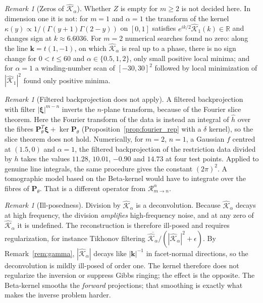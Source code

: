\documentclass[11pt,a4paper]{article}
\theoremstyle{plain}
\theoremstyle{definition}
\theoremstyle{remark}
\newtheorem{remark}[theorem]{Remark}
\numberwithin{equation}{section}
\begin{document}
\begin{remark}[Zeros of $\widehat{\mathcal{K}}_\alpha$]
Whether $Z$ is empty for $m \ge 2$ is not decided here. In dimension one it is not: for $m = 1$ and $\alpha = 1$ the transform of the kernel $\kappa(y) \propto 1/(\Gamma(y+1)\Gamma(2-y))$ on $[0,1]$ satisfies $e^{ik/2}\widehat{\mathcal{K}}_1(k) \in \mathbb{R}$ and changes sign at $k \approx 6.6036$. For $m = 2$ numerical searches found no zero: along the line $\mathbf{k} = t(1,-1)$, on which $\widehat{\mathcal{K}}_\alpha$ is real up to a phase, there is no sign change for $0 < t \le 60$ and $\alpha \in \{0.5, 1, 2\}$, only small positive local minima; and for $\alpha = 1$ a winding-number scan of $[-30,30]^2$ followed by local minimization of $|\widehat{\mathcal{K}}_1|^2$ found only positive minima.
\end{remark}

\begin{remark}[Filtered backprojection does not apply]
A filtered backprojection with filter $|\boldsymbol{\xi}|^{m-n}$ inverts the $n$-plane transform, because of the Fourier slice theorem. Here the Fourier transform of the data is instead an integral of $\widehat{h}$ over the fibres $\mathbf{P}_\theta^T\boldsymbol{\xi} + \ker\mathbf{P}_\theta$ (Proposition~\ref{prop:fourier_rep} with a $\delta$ kernel), so the slice theorem does not hold. Numerically, for $m = 2$, $n = 1$, a Gaussian $f$ centred at $(1.5, 0)$ and $\alpha = 1$, the filtered backprojection of the restriction data divided by $h$ takes the values $11.28$, $10.01$, $-0.90$ and $14.73$ at four test points. Applied to genuine line integrals, the same procedure gives the constant $(2\pi)^2$. A tomographic model based on the Beta-kernel would have to integrate over the fibres of $\mathbf{P}_\theta$. That is a different operator from $\mathcal{R}^\alpha_{m\to n}$.
\end{remark}

\begin{remark}[Ill-posedness]
Division by $\widehat{\mathcal{K}}_\alpha$ is a deconvolution. Because $\widehat{\mathcal{K}}_\alpha$ decays at high frequency, the division \emph{amplifies} high-frequency noise, and at any zero of $\widehat{\mathcal{K}}_\alpha$ it is undefined. The reconstruction is therefore ill-posed and requires regularization, for instance Tikhonov filtering $\overline{\widehat{\mathcal{K}}_\alpha}/(|\widehat{\mathcal{K}}_\alpha|^2 + \epsilon)$. By Remark~\ref{rem:gamma}, $|\widehat{\mathcal{K}}_\alpha|$ decays like $|\mathbf{k}|^{-1}$ in facet-normal directions, so the deconvolution is mildly ill-posed of order one. The kernel therefore does not regularize the inversion or suppress Gibbs ringing; the effect is the opposite. The Beta-kernel smooths the \emph{forward} projections; that smoothing is exactly what makes the inverse problem harder.
\end{remark}
\end{document}
